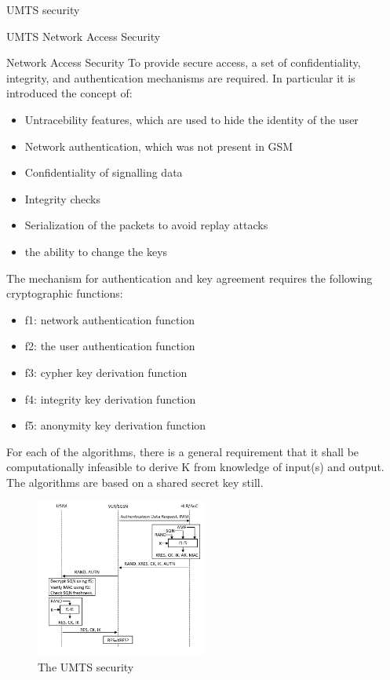 \begin{section}{UMTS security}
\begin{subsection}{UMTS Network Access Security}
\begin{subsubsection}{Network Access Security}
        To provide secure access, a set of confidentiality, integrity, and authentication mechanisms
        are required. In particular it is introduced the concept of:
        \begin{itemize}
          \item Untracebility features, which are used to hide the identity of the user
          \item Network authentication, which was not present in GSM
          \item Confidentiality of signalling data
          \item Integrity checks
          \item Serialization of the packets to avoid replay attacks
          \item the ability to change the keys
        \end{itemize}

        The mechanism for authentication and key agreement requires the following cryptographic
        functions:
        \begin{itemize}
          \item f1: network authentication function
          \item f2: the user authentication function
          \item f3: cypher key derivation function
          \item f4: integrity key derivation function
          \item f5: anonymity key derivation function
        \end{itemize}
        For each of the algorithms, there is a general requirement that it shall be computationally
        infeasible to derive K from knowledge of input(s) and output. The algorithms are based on 
        a shared secret key still.

        \begin{figure}[h]
          \centering
          \includegraphics[width=0.5\textwidth]{img/wireless/umts authentication.png}
          \caption{The UMTS security}
        \end{figure}


\end{subsubsection}
\end{subsection}
\end{section}

